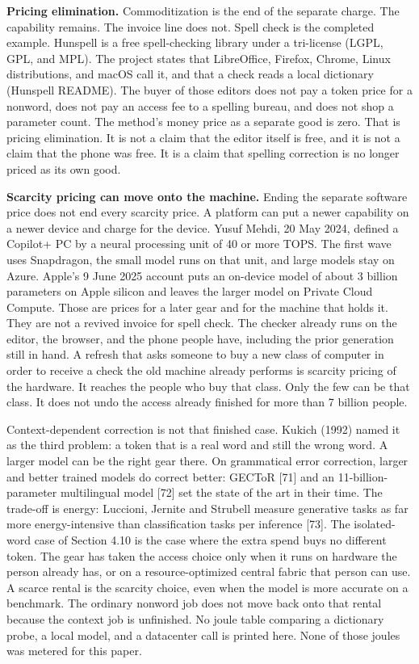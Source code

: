 \documentclass[
  10pt,
]{article}
\begin{document}
\textbf{Pricing elimination.} Commoditization is the end of the separate
charge. The capability remains. The invoice line does not. Spell check
is the completed example. Hunspell is a free spell-checking library
under a tri-license (LGPL, GPL, and MPL). The project states that
LibreOffice, Firefox, Chrome, Linux distributions, and macOS call it,
and that a check reads a local dictionary (Hunspell README). The buyer
of those editors does not pay a token price for a nonword, does not pay
an access fee to a spelling bureau, and does not shop a parameter count.
The method's money price as a separate good is zero. That is pricing
elimination. It is not a claim that the editor itself is free, and it is
not a claim that the phone was free. It is a claim that spelling
correction is no longer priced as its own good.

\textbf{Scarcity pricing can move onto the machine.} Ending the separate
software price does not end every scarcity price. A platform can put a
newer capability on a newer device and charge for the device. Yusuf
Mehdi, 20 May 2024, defined a Copilot+ PC by a neural processing unit of
40 or more TOPS. The first wave uses Snapdragon, the small model runs on
that unit, and large models stay on Azure. Apple's 9 June 2025 account
puts an on-device model of about 3 billion parameters on Apple silicon
and leaves the larger model on Private Cloud Compute. Those are prices
for a later gear and for the machine that holds it. They are not a
revived invoice for spell check. The checker already runs on the editor,
the browser, and the phone people have, including the prior generation
still in hand. A refresh that asks someone to buy a new class of
computer in order to receive a check the old machine already performs is
scarcity pricing of the hardware. It reaches the people who buy that
class. Only the few can be that class. It does not undo the access
already finished for more than 7 billion people.

Context-dependent correction is not that finished case. Kukich (1992)
named it as the third problem: a token that is a real word and still the
wrong word. A larger model can be the right gear there. On grammatical
error correction, larger and better trained models do correct better:
GECToR {[}71{]} and an 11-billion-parameter multilingual model {[}72{]}
set the state of the art in their time. The trade-off is energy:
Luccioni, Jernite and Strubell measure generative tasks as far more
energy-intensive than classification tasks per inference {[}73{]}. The
isolated-word case of Section 4.10 is the case where the extra spend
buys no different token. The gear has taken the access choice only when
it runs on hardware the person already has, or on a resource-optimized
central fabric that person can use. A scarce rental is the scarcity
choice, even when the model is more accurate on a benchmark. The
ordinary nonword job does not move back onto that rental because the
context job is unfinished. No joule table comparing a dictionary probe,
a local model, and a datacenter call is printed here. None of those
joules was metered for this paper.
\end{document}
